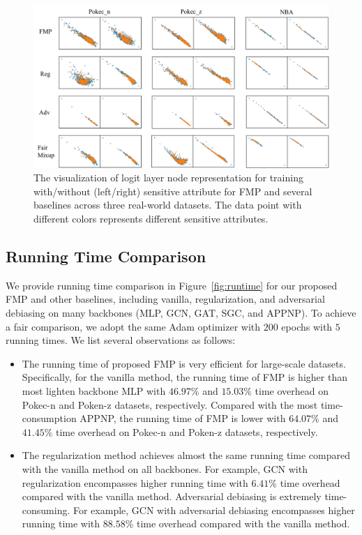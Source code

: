 \documentclass[letterpaper]{article} %
\theoremstyle{plain}
\theoremstyle{definition}
\theoremstyle{remark}
\begin{document}
\begin{figure}[t]
\centering
\includegraphics[width=0.99\linewidth]{inf_visual.pdf}

\caption{The visualization of logit layer node representation for training with/without (left/right) sensitive attribute for FMP and several baselines across three real-world datasets. The data point with different colors represents different sensitive attributes.}
\label{fig:infprobe}
\end{figure}

\subsection{Running Time Comparison} \label{app:runningtime}
We provide running time comparison in Figure~\ref{fig:runtime} for our proposed FMP and other baselines, including vanilla, regularization, and adversarial debiasing on many backbones (MLP, GCN, GAT, SGC, and APPNP). To achieve a fair comparison, we adopt the same Adam optimizer with $200$ epochs with $5$ running times.
We list several observations as follows:
\begin{itemize}[leftmargin=0.2cm, itemindent=.0cm, itemsep=0.0cm, topsep=0.0cm]
    \item The running time of proposed FMP is very efficient for large-scale datasets. Specifically, for the vanilla method, the running time of FMP is higher than most lighten backbone MLP with $46.97\%$ and $15.03\%$ time overhead on Pokec-n and Poken-z datasets, respectively. Compared with the most time-consumption APPNP, the running time of FMP is lower with $64.07\%$ and $41.45\%$ time overhead on Pokec-n and Poken-z datasets, respectively.
    \item The regularization method achieves almost the same running time compared with the vanilla method on all backbones. For example, GCN with regularization encompasses higher running time with $6.41\%$ time overhead compared with the vanilla method. Adversarial debiasing is extremely time-consuming. For example, GCN with adversarial debiasing encompasses higher running time with $88.58\%$ time overhead compared with the vanilla method.
\end{itemize}
\end{document}
